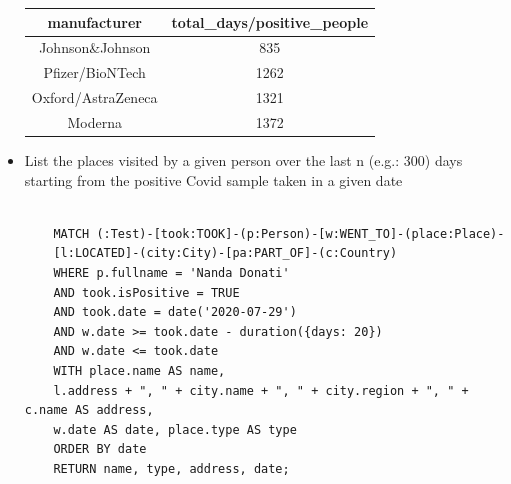 \documentclass{article}[IEEEtran]
\begin{document}
\begin{itemize}
\begin{lstlisting}
    \end{lstlisting}
    
    \vspace{-0.5cm}
    
    \begin{table}[H]
    \hspace{1.48cm}
    \begin{tabular}{|c|c|}
    \hline
    \textbf{manufacturer} & \textbf{total\_days/positive\_people} \\ \hline
    Johnson\&Johnson      & 835                                   \\ \hline
    Pfizer/BioNTech       & 1262                                  \\ \hline
    Oxford/AstraZeneca    & 1321                                  \\ \hline
    Moderna               & 1372                                  \\ \hline
   
    \end{tabular}
    \end{table}
    
    \newpage
    
\item List the places visited by a given person over the last n (e.g.: 300) days 
starting from the positive Covid sample taken in a given date
    
    \begin{lstlisting}
    
    MATCH (:Test)-[took:TOOK]-(p:Person)-[w:WENT_TO]-(place:Place)-
    [l:LOCATED]-(city:City)-[pa:PART_OF]-(c:Country)
    WHERE p.fullname = 'Nanda Donati'
    AND took.isPositive = TRUE
    AND took.date = date('2020-07-29')
    AND w.date >= took.date - duration({days: 20})
    AND w.date <= took.date
    WITH place.name AS name, 
    l.address + ", " + city.name + ", " + city.region + ", " + c.name AS address,
    w.date AS date, place.type AS type
    ORDER BY date
    RETURN name, type, address, date;

    
    \end{lstlisting}
    
    \vspace{-1.2cm}


\end{itemize}
\end{document}
